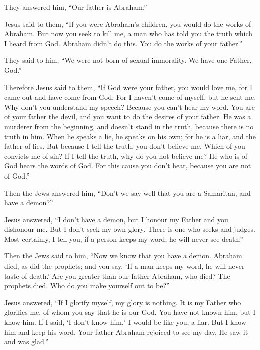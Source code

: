  They answered him, ``Our father is Abraham.''

Jesus said to them, ``If you were Abraham's children, you would do the
works of Abraham.  But now you seek to kill me, a man who
has told you the truth which I heard from God. Abraham didn't do this.
 You do the works of your father.''

They said to him, ``We were not born of sexual immorality. We have one
Father, God.''

 Therefore Jesus said to them, ``If God were your father,
you would love me, for I came out and have come from God. For I haven't
come of myself, but he sent me.  Why don't you understand
my speech? Because you can't hear my word.  You are of
your father the devil, and you want to do the desires of your father. He
was a murderer from the beginning, and doesn't stand in the truth,
because there is no truth in him. When he speaks a lie, he speaks on his
own; for he is a liar, and the father of lies.  But
because I tell the truth, you don't believe me.  Which of
you convicts me of sin? If I tell the truth, why do you not believe me?
 He who is of God hears the words of God. For this cause
you don't hear, because you are not of God.''

 Then the Jews answered him, ``Don't we say well that you
are a Samaritan, and have a demon?''

 Jesus answered, ``I don't have a demon, but I honour my
Father and you dishonour me.  But I don't seek my own
glory. There is one who seeks and judges.  Most
certainly, I tell you, if a person keeps my word, he will never see
death.''

 Then the Jews said to him, ``Now we know that you have a
demon. Abraham died, as did the prophets; and you say, `If a man keeps
my word, he will never taste of death.'  Are you greater
than our father Abraham, who died? The prophets died. Who do you make
yourself out to be?''

 Jesus answered, ``If I glorify myself, my glory is
nothing. It is my Father who glorifies me, of whom you say that he is
our God.  You have not known him, but I know him. If I
said, `I don't know him,' I would be like you, a liar. But I know him
and keep his word.  Your father Abraham rejoiced to see
my day. He saw it and was glad.''

